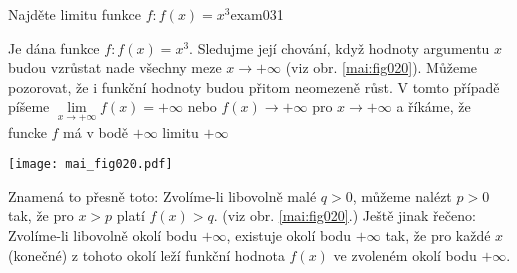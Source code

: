 \begin{mathexam}{Najděte limitu funkce \(f: f(x) = x^3\)}{exam031}
  
  Je dána funkce \(f: f(x) = x^3\). Sledujme její chování, když hodnoty argumentu \(x\) budou
  vzrůstat nade všechny meze \(x \to + \infty\) (viz obr. \ref{mai:fig020}). Můžeme pozorovat, že i
  funkční hodnoty budou přitom neomezeně růst. V tomto případě píšeme
  \(\lim\limits_{x\to+\infty}f(x) = +\infty\) nebo \(f(x)\to+\infty\) pro  \(x\to+\infty\) a říkáme,
  že funcke \(f\) má v bodě \(+\infty\) limitu \(+\infty\)
  
  {\centering
  \captionsetup{type=figure}
%   
  \texttt{[image: mai\_fig020.pdf]}
  \par}

  Znamená to přesně toto: Zvolíme-li libovolně malé \(q > 0\), můžeme nalézt \(p > 0\) tak, že pro
  \(x > p\) platí \(f(x) > q\). (viz obr. \ref{mai:fig020}.) Ještě jinak řečeno: Zvolíme-li
  libovolně okolí bodu \(+\infty\), existuje okolí bodu \(+\infty\) tak, že pro každé \(x\)
  (konečné) z tohoto okolí leží funkční hodnota \(f(x)\) ve zvoleném okolí bodu \(+\infty\).
\end{mathexam}